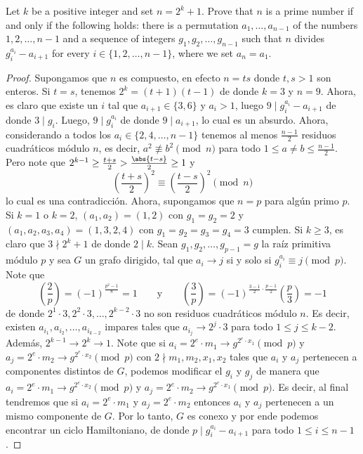 \begin{probHG}[ISL 2011/N8]
	Let $k$ be a positive integer and set $n=2^k+1$. Prove that $n$ is a prime number if and only if the following holds: there is a permutation $a_1,\dots,a_{n-1}$ of the numbers $1,2,\dots,n-1$ and a sequence of integers $g_1,g_2,\dots,g_{n-1}$ such that $n$ divides $g_i^{a_i}-a_{i+1}$ for every $i\in\{1,2,\dots,n-1\}$, where we set $a_n=a_1$.
\end{probHG}

\begin{proof}
	Supongamos que $n$ es compuesto, en efecto $n=ts$ donde $t,s>1$ son enteros. Si $t=s$, tenemos $2^k=(t+1)(t-1)$ de donde $k=3$ y $n=9$. Ahora, es claro que existe un $i$ tal que $a_{i+1}\in\{3,6\}$ y $a_i>1$, luego $9\mid g_i^{a_i}-a_{i+1}$ de donde $3\mid g_i$. Luego, $9\mid g_i^{a_i}$ de donde $9\mid a_{i+1}$, lo cual es un absurdo. Ahora, considerando a todos los $a_i\in\{2,4,\dots,n-1\}$ tenemos al menos $\frac{n-1}{2}$ residuos cuadráticos módulo $n$, es decir, $a^2\not\equiv b^2\pmod n$ para todo $1\le a\ne b\le\frac{n-1}{2}$. Pero note que $2^{k-1}\ge\frac{t+s}{2}>\frac{\abs{t-s}}{2}\ge 1$ y
	\[\left(\frac{t+s}{2}\right)^2\equiv\left(\frac{t-s}{2}\right)^2\pmod n\]
	lo cual es una contradicción. Ahora, supongamos que $n=p$ para algún primo $p$. Si $k=1$ o $k=2$, $(a_1,a_2)=(1,2)$ con $g_1=g_2=2$ y $(a_1,a_2,a_3,a_4)=(1,3,2,4)$ con $g_1=g_2=g_3=g_4=3$ cumplen. Si $k\ge 3$, es claro que $3\nmid 2^k+1$ de donde $2\mid k$. Sean $g_1,g_2,\dots,g_{p-1}=g$ la raíz primitiva módulo $p$ y sea $G$ un grafo dirigido, tal que $a_i\to j$ si y solo si $g_i^{a_i}\equiv j\pmod p$. Note que
	\[\left(\frac2p\right)=(-1)^\frac{p^2-1}{8}=1\qquad\text{y}\qquad\left(\frac3p\right)=(-1)^{\frac{3-1}{2}\cdot\frac{p-1}{2}}\left(\frac p3\right)=-1\]
	de donde $2^1\cdot 3,2^2\cdot 3,\dots,2^{k-2}\cdot 3$ no son residuos cuadráticos módulo $n$. Es decir, existen $a_{i_1},a_{i_2},\dots,a_{i_{k-2}}$ impares tales que $a_{i_j}\to 2^j\cdot 3$ para todo $1\le j\le k-2$. Además, $2^{k-1}\to 2^k\to 1$. Note que si $a_i=2^e\cdot m_1\to g^{2^e\cdot x_1}\pmod p$ y $a_j=2^e\cdot m_2\to g^{2^e\cdot x_2}\pmod p$ con $2\nmid m_1,m_2,x_1,x_2$ tales que $a_i$ y $a_j$ pertenecen a componentes distintos de $G$, podemos modificar el $g_i$ y $g_j$ de manera que $a_i=2^e\cdot m_1\to g^{2^e\cdot x_2}\pmod p$ y $a_j=2^e\cdot m_2\to g^{2^e\cdot x_1}\pmod p$. Es decir, al final tendremos que si $a_i=2^e\cdot m_1$ y $a_j=2^e\cdot m_2$ entonces $a_i$ y $a_j$ pertenecen a un mismo componente de $G$. Por lo tanto, $G$ es conexo y por ende podemos encontrar un ciclo Hamiltoniano, de donde $p\mid g_i^{a_i}-a_{i+1}$ para todo $1\le i\le n-1$.
\end{proof}

